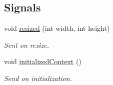 \subsection*{Signals}
\begin{DoxyCompactItemize}
\item 
\mbox{\label{classrev_1_1_view_1_1_g_l_widget_ab0c875c91812548023e8e888e451f08f}} 
void \mbox{\hyperlink{classrev_1_1_view_1_1_g_l_widget_ab0c875c91812548023e8e888e451f08f}{resized}} (int width, int height)
\begin{DoxyCompactList}\small\item\em Sent on resize. \end{DoxyCompactList}\item 
\mbox{\label{classrev_1_1_view_1_1_g_l_widget_ae160b0c7d7ed607b4710fdb0a8d2d052}} 
void \mbox{\hyperlink{classrev_1_1_view_1_1_g_l_widget_ae160b0c7d7ed607b4710fdb0a8d2d052}{initialized\+Context}} ()
\begin{DoxyCompactList}\small\item\em Send on initialization. \end{DoxyCompactList}\end{DoxyCompactItemize}
